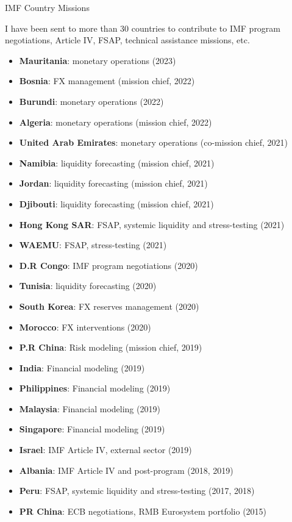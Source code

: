 \documentclass[usegeometry, 10pt, a4paper]{cv} %
\begin{document}
\newpage

\begin{rubriquetableau}[0.95\textwidth]{IMF Country Missions}

I have been sent to more than 30 countries to contribute to IMF program negotiations, Article IV, FSAP, technical assistance missions, etc.\\

\begin{multicols}{2}
\begin{itemize}
  \item \textbf{Mauritania}: monetary operations (2023)
  \item \textbf{Bosnia}: FX management (mission chief, 2022)
  \item \textbf{Burundi}: monetary operations (2022)
  \item \textbf{Algeria}: monetary operations (mission chief, 2022)
  \item \textbf{United Arab Emirates}: monetary operations (co-mission chief, 2021)
  \item \textbf{Namibia}: liquidity forecasting (mission chief, 2021)
  \item \textbf{Jordan}: liquidity forecasting (mission chief, 2021)
  \item \textbf{Djibouti}: liquidity forecasting (mission chief, 2021)
  \item \textbf{Hong Kong SAR}: FSAP, systemic liquidity and stress-testing (2021)
  \item \textbf{WAEMU}: FSAP, stress-testing (2021)
  \item \textbf{D.R Congo}: IMF program negotiations (2020)
  \item \textbf{Tunisia}: liquidity forecasting (2020)
  \item \textbf{South Korea}: FX reserves management (2020)
  \item \textbf{Morocco}: FX interventions (2020)  
  \item \textbf{P.R China}: Risk modeling (mission chief, 2019) 
  \item \textbf{India}: Financial modeling (2019)
  \item \textbf{Philippines}: Financial modeling (2019)
  \item \textbf{Malaysia}: Financial modeling (2019)
  \item \textbf{Singapore}: Financial modeling (2019)
  \item \textbf{Israel}: IMF Article IV, external sector (2019)
  \item \textbf{Albania}: IMF Article IV and post-program (2018, 2019)
  \item \textbf{Peru}: FSAP, systemic liquidity and stress-testing (2017, 2018)
  \item \textbf{PR China}: ECB negotiations, RMB Eurosystem portfolio (2015)
\end{itemize}


\end{multicols}
\end{rubriquetableau}
\end{document}
